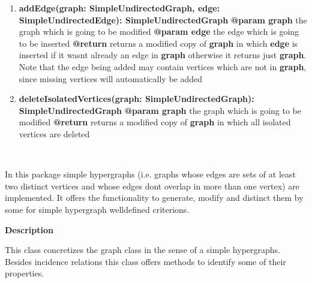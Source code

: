 \begin{enumerate}[+]
		\item{
			\textbf{addEdge(graph: SimpleUndirectedGraph, edge: SimpleUndirectedEdge): SimpleUndirectedGraph} \newline
			\textbf{@param graph} the graph which is going to be modified \newline
			\textbf{@param edge} the edge which is going to be inserted \newline
			\textbf{@return} returns a modified copy of \textbf{graph} in which \textbf{edge} is inserted if it wasnt already an edge in \textbf{graph} otherwise it returns just \textbf{graph}. Note that the edge being added may contain vertices which are not in \textbf{graph}, since missing vertices will automatically be added
		}
		\item{
			\textbf{deleteIsolatedVertices(graph: SimpleUndirectedGraph): SimpleUndirectedGraph} \newline
			\textbf{@param graph} the graph which is going to be modified \newline
			\textbf{@return} returns a modified copy of \textbf{graph} in which all isolated vertices are deleted		}
	\end{enumerate}
	
	~\newpage
	
	
	In this package simple hypergraphs (i.e. graphs whose edges are sets of at least two distinct vertices and whose edges dont overlap in more than one vertex) are implemented. It offers the functionality to generate, modify and distinct them by some for simple hypergraph welldefined criterions.
	
	
	\textbf{Description}
	
	This class concretizes the graph class in the sense of a simple hypergraphs. Besides incidence relations this class offers methods to identify some of their properties.
	
